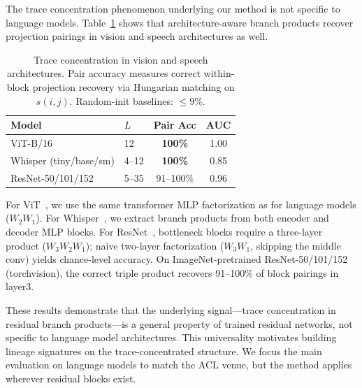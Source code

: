 The trace concentration phenomenon underlying our method is not specific to language models. Table~\ref{tab:vision-speech} shows that architecture-aware branch products recover projection pairings in vision and speech architectures as well.

\begin{table}[h]
\centering
\footnotesize
\setlength{\tabcolsep}{4pt}
\begin{tabular}{@{}llcc@{}}
\toprule
Model & $L$ & Pair Acc & AUC \\
\midrule
ViT-B/16 & 12 & \textbf{100\%} & 1.00 \\
Whisper (tiny/base/sm) & 4--12 & \textbf{100\%} & 0.85 \\
ResNet-50/101/152 & 5--35 & 91--100\% & 0.96 \\
\bottomrule
\end{tabular}
\caption{Trace concentration in vision and speech architectures. Pair accuracy measures correct within-block projection recovery via Hungarian matching on $s(i,j)$. Random-init baselines: $\le 9\%$.}
\label{tab:vision-speech}
\end{table}

For ViT~\citep{dosovitskiy2020vit}, we use the same transformer MLP factorization as for language models ($W_2 W_1$). For Whisper~\citep{radford2023whisper}, we extract branch products from both encoder and decoder MLP blocks. For ResNet~\citep{he2016resnet}, bottleneck blocks require a three-layer product ($W_3 W_2 W_1$); naive two-layer factorization ($W_3 W_1$, skipping the middle conv) yields chance-level accuracy. On ImageNet-pretrained ResNet-50/101/152 (torchvision), the correct triple product recovers 91--100\% of block pairings in layer3.

These results demonstrate that the underlying signal---trace concentration in residual branch products---is a general property of trained residual networks, not specific to language model architectures. This universality motivates building lineage signatures on the trace-concentrated structure. We focus the main evaluation on language models to match the ACL venue, but the method applies wherever residual blocks exist.

